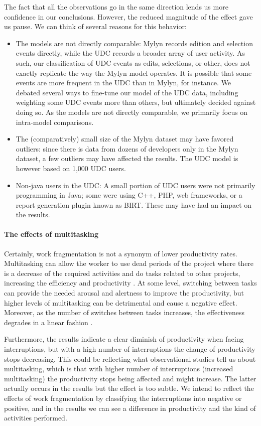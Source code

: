 \documentclass[times]{smrauth}
\begin{document}
The fact that all the observations go in the same direction lends us more confidence in our conclusions. However, the reduced magnitude of the effect gave us pause. We can think of several reasons for this behavior:

\begin{itemize}
\item The models are not directly comparable: Mylyn records edition and selection events directly, while the UDC records a broader array of user activity. As such, our classification of UDC events as edits, selections, or other, does not exactly replicate the way the Mylyn model operates. It is possible that some events are more frequent in the UDC than in Mylyn, for instance. We debated several ways to fine-tune our model of the UDC data, including weighting some UDC events more than others, but ultimately decided against doing so. As the models are not directly comparable, we primarily focus on intra-model comparisons.
\item The (comparatively) small size of the Mylyn dataset may have favored outliers: since there is data from dozens of developers only in the Mylyn dataset, a few outliers may have affected the results. The UDC model is however based on 1,000 UDC users.
\item Non-java users in the UDC: A small portion of UDC users were not primarily programming in Java; some were using C++, PHP, web frameworks, or a report generation plugin known as BIRT. These may have had an impact on the results.
\end{itemize}

\paragraph{The effects of multitasking}
Certainly, work fragmentation is not a synonym of lower productivity rates. Multitasking can allow the worker to use dead periods of the project where there is a decrease of the required activities and do tasks related to other projects, increasing the efficiency and productivity \cite{ABV12}. At some level, switching between tasks can provide the needed arousal and alertness to improve the productivity, but higher levels of multitasking can be detrimental and cause a negative effect. Moreover, as the number of switches between tasks increases, the effectiveness degrades in a linear fashion \cite{AB12}. 

Furthermore, the results indicate a clear diminish of productivity when facing interruptions, but with a high number of interruptions the change of productivity stops decreasing. This could be reflecting what observational studies tell us about multitasking, which is that with higher number of interruptions (increased multitasking) the productivity stops being affected and might increase. The latter actually occurs in the results but the effect is too subtle. 
We intend to reflect the effects of work fragmentation by classifying the interruptions into negative or positive, and in the results we can see a difference in productivity and the kind of activities performed.
\end{document}
